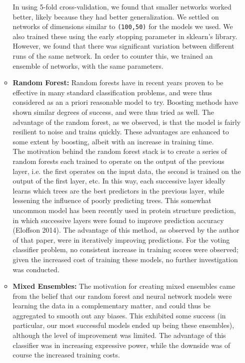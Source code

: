 \begin{itemize}
\begin{itemize}
    In using 5-fold cross-validation, we found that smaller networks worked better, likely because they had better generalization. We settled on networks of dimensions similar to \texttt{(100,50)} for the models we used. We also trained these using the early stopping parameter in sklearn's library. However, we found that there was significant variation between different runs of the same network. In order to counter this, we trained an ensemble of networks, with the same parameters.

    \item \textbf{Random Forest:} Random forests have in recent years proven to be effective in many standard classification problems, and were thus considered as an a priori reasonable model to try. Boosting methods have shown similar degrees of success, and were thus tried as well. The advantage of the random forest, as we observed, is that the model is fairly resilient to noise and trains quickly. These advantages are enhanced to some extent by boosting, albeit with an increase in training time.\\

    The motivation behind the random forest stack is to create a series of random forests each trained to operate on the output of the previous layer, i.e. the first operates on the input data, the second is trained on the output of the first layer, etc. In this way, each successive layer ideally learns which trees are the best predictors in the previous layer, while lessening the influence of poorly predicting trees. This somewhat uncommon model has been recently used in protein structure prediction, in which successive layers were found to improve prediction accuracy (Eloffson 2014). The advantage of this method, as observed by the author of that paper, were in iteratively improving predictions. For the voting classifier problem, no consistent increase in training scores were observed; given the increased cost of training these models, no further investigation was conducted.

    \item \textbf{Mixed Ensembles:} The motivation for creating mixed ensembles came from the belief that our random forest and neural network models were learning the data in a complementary matter, and could thus be aggregated to smooth out any biases. This exhibited some success (in particular, our most successful models ended up being these ensembles), although the level of improvement was limited. The advantage of this classifier was in increasing expressive power, while the downside was of course the increased training costs.


\end{itemize}
\end{itemize}
